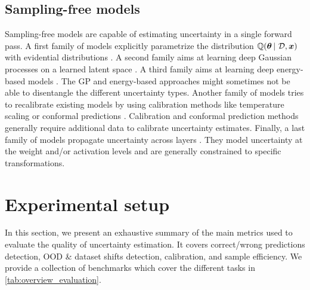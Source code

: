 \subsection{Sampling-free models}
Sampling-free models are capable of estimating uncertainty in a single forward pass. A first family of models explicitly parametrize the distribution $\operatorname{\mathbb{Q}}(\bm{\theta} \,|\, \operatorname{\mathcal{D}}, \bm{x})$ with evidential distributions \citep{survey_evidential_uncertainty,robustness-uncertainty-dirichlet,max_gap_id_ood,uncertainty-generative-classifier,multifaceted_uncertainty,graph-postnet, lightweight-prob-net}. A second family aims at learning deep Gaussian processes on a learned latent space \citep{uncertainty-distance-awareness, due, duq, uceloss}. A third family aims at learning deep energy-based models \citep{ood_ebm, jem_ebm}. The GP and energy-based approaches might sometimes not be able to disentangle the different uncertainty types. Another family of models tries to recalibrate existing models by using calibration methods like temperature scaling \cite{calibration-network} or conformal predictions \cite{conformal-survey}. Calibration and conformal prediction methods generally require additional data to calibrate uncertainty estimates. Finally, a last family of models propagate uncertainty across layers \citep{natural-parameter-network, sampling-free-variance-propagation, feed-forward-propagation, lightweight-prob-net, probabilistic-backprop-scalable-bnn}. They model uncertainty at the weight and/or activation levels and are generally constrained to specific transformations.

\section{Experimental setup}

In this section, we present an exhaustive summary of the main metrics used to evaluate the quality of uncertainty estimation. 
It covers correct/wrong predictions detection, OOD \& dataset shifts detection, calibration, and sample efficiency.
We provide a collection of benchmarks which cover the different tasks in \cref{tab:overview_evaluation}.

